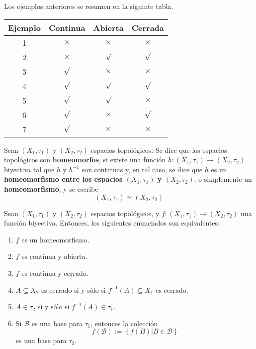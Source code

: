 \documentclass[12pt]{report}
\theoremstyle{largebreak}
\newcommand\cf[3]{\ensuremath{#1:#2\rightarrow#3}}
\begin{document}
    Los ejemplos anteriores se resumen en la siguinte tabla.

    \begin{center}
        \begin{tabular}{c|c|c|c}
            Ejemplo & Continua & Abierta & Cerrada \\
            \hline
            1 & $\times$ & $\times$ & $\times$ \\
            2 & $\times$ & $\surd$ & $\surd$ \\
            3 & $\surd$ & $\times$ & $\times$ \\
            4 & $\surd$ & $\surd$ & $\surd$ \\
            5 & $\surd$ & $\surd$ & $\times$ \\
            6 & $\surd$ & $\times$ & $\surd$ \\
            7 & $\surd$ & $\times$ & $\times$ \\
        \end{tabular}
    \end{center}

    \begin{mydef}
        Sean $(X_1,\tau_1)$ y $(X_2,\tau_2)$ espacios topológicos. Se dice que los espacios topológicos son \textbf{homeomorfos}, si existe una función $\cf{h}{(X_1,\tau_1)}{(X_2,\tau_2)}$ biyectiva tal que $h$ y $h^{-1}$ son continuas y, en tal caso, se dice que $h$ es un \textbf{homeomorfismo entre los espacios $(X_1,\tau_1)$ y $(X_2,\tau_2)$}, o simplemente un \textbf{homeomorfismo}, y se escribe
        \begin{equation*}
            (X_1,\tau_1) \simeq (X_2,\tau_2)
        \end{equation*}
    \end{mydef}
    
    \begin{propo}
        Sean $(X_1,\tau_1)$ y $(X_2,\tau_2)$ espacios topológicos, y $\cf{f}{(X_1,\tau_1)}{(X_2,\tau_2)}$ una función biyectiva. Entonces, los siguientes enunciados son equivalentes:
        \begin{enumerate}
            \item $f$ es un homeomorfismo.
            \item $f$ es continua y abierta.
            \item $f$ es continua y cerrada.
            \item $A\subseteq X_2$ es cerrado si y sólo si $f^{-1}(A)\subseteq X_1$ es cerrado.
            \item $A\in\tau_2$ si y sólo si $f^{-1}(A)\in\tau_1$.
            \item Si $\mathcal{B}$ es una base para $\tau_1$, entonces la colección
            \begin{equation*}
                f(\mathcal{B}):=\left\{f(B)\Big|B\in\mathcal{B} \right\}
            \end{equation*}
            es una base para $\tau_2$.
        \end{enumerate}
    \end{propo}
\end{document}
